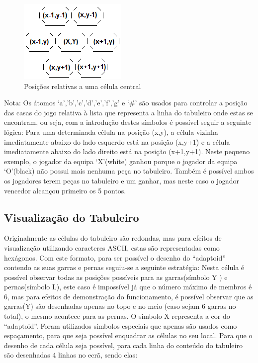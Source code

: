 \documentclass[a4paper]{article}
\begin{document}
\begin{figure}[h]
    \begin{center}
        \includegraphics[scale=1]{posicoesRelativas}
        \caption{Posições relativas a uma célula central}
        \centering
    \end{center}
\end{figure}
Nota: Os átomos ‘a’,’b’,’c’,'d','e','f','g' e ‘\#’ são usados para controlar a posição das casas do jogo relativa à lista que representa a linha do tabuleiro onde estas se encontram, ou seja, com a introdução destes símbolos é possível seguir a seguinte lógica: Para uma determinada célula na posição (x,y), a célula-vizinha imediatamente abaixo do lado esquerdo está na posição (x,y+1) e a célula imediatamente abaixo do lado direito está na posição (x+1,y+1). Neste pequeno exemplo, o jogador da equipa ‘X’(white) ganhou porque o jogador da equipa ‘O’(black) não possui mais nenhuma peça no tabuleiro. Também é possível ambos os jogadores terem peças no tabuleiro e um ganhar, mas neste caso o jogador vencedor alcançou primeiro os 5 pontos.



\newpage

\subsection{Visualização do Tabuleiro} Originalmente as células do tabuleiro são redondas, mas para efeitos de visualização utilizando caracteres ASCII, estas são representadas como hexágonos. Com este formato, para ser possível o desenho do “adaptoid” contendo as suas garras e pernas seguiu-se a seguinte estratégia: Nesta célula é possível observar todas as posições possíveis para as garras(símbolo Y ) e pernas(símbolo L), este caso é impossível já que o número máximo de membros é 6, mas para efeitos de demonstração do funcionamento, é possível observar que as garras(Y) são desenhadas apenas no topo e no meio (caso sejam 6 garras no total), o mesmo acontece para as pernas. O simbolo X representa a cor do “adaptoid”. Foram utilizados símbolos especiais que apenas são usados como espaçamento, para que seja possível enquadrar as células no seu local. 
Para que o desenho de cada célula seja possível, para cada linha do conteúdo do tabuleiro são desenhadas 4 linhas no ecrã, sendo elas:
\end{document}
